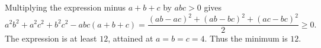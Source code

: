 Multiplying the expression minus $a+b+c$ by $abc>0$ gives
\[
a^2b^2+a^2c^2+b^2c^2-abc(a+b+c)
=\dfrac{(ab-ac)^2+(ab-bc)^2+(ac-bc)^2}{2}\ge0.
\]
The expression is at least $12$, attained at $a=b=c=4$. Thus the minimum is $\boxed{12}$.
